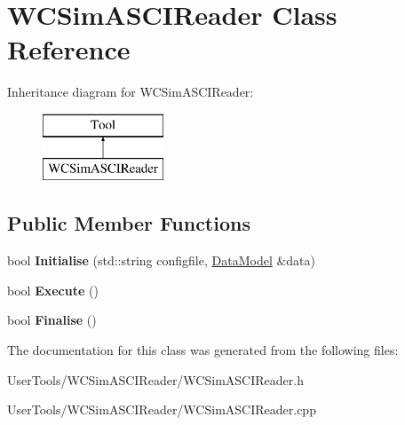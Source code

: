 \hypertarget{classWCSimASCIReader}{\section{W\-C\-Sim\-A\-S\-C\-I\-Reader Class Reference}
\label{classWCSimASCIReader}
}
Inheritance diagram for W\-C\-Sim\-A\-S\-C\-I\-Reader\-:\begin{figure}[H]
\begin{center}
\leavevmode
\includegraphics[height=2.000000cm]{classWCSimASCIReader}
\end{center}
\end{figure}
\subsection*{Public Member Functions}
\begin{DoxyCompactItemize}
\item 
\hypertarget{classWCSimASCIReader_a306f7247090985ac8347817dc3c8b316}{bool {\bfseries Initialise} (std\-::string configfile, \hyperlink{classDataModel}{Data\-Model} \&data)}\label{classWCSimASCIReader_a306f7247090985ac8347817dc3c8b316}

\item 
\hypertarget{classWCSimASCIReader_a149c2fc15239bb4e450456e41958cb72}{bool {\bfseries Execute} ()}\label{classWCSimASCIReader_a149c2fc15239bb4e450456e41958cb72}

\item 
\hypertarget{classWCSimASCIReader_a41815a094817b22741cd2dd984cdd52e}{bool {\bfseries Finalise} ()}\label{classWCSimASCIReader_a41815a094817b22741cd2dd984cdd52e}

\end{DoxyCompactItemize}


The documentation for this class was generated from the following files\-:\begin{DoxyCompactItemize}
\item 
User\-Tools/\-W\-C\-Sim\-A\-S\-C\-I\-Reader/W\-C\-Sim\-A\-S\-C\-I\-Reader.\-h\item 
User\-Tools/\-W\-C\-Sim\-A\-S\-C\-I\-Reader/W\-C\-Sim\-A\-S\-C\-I\-Reader.\-cpp\end{DoxyCompactItemize}
